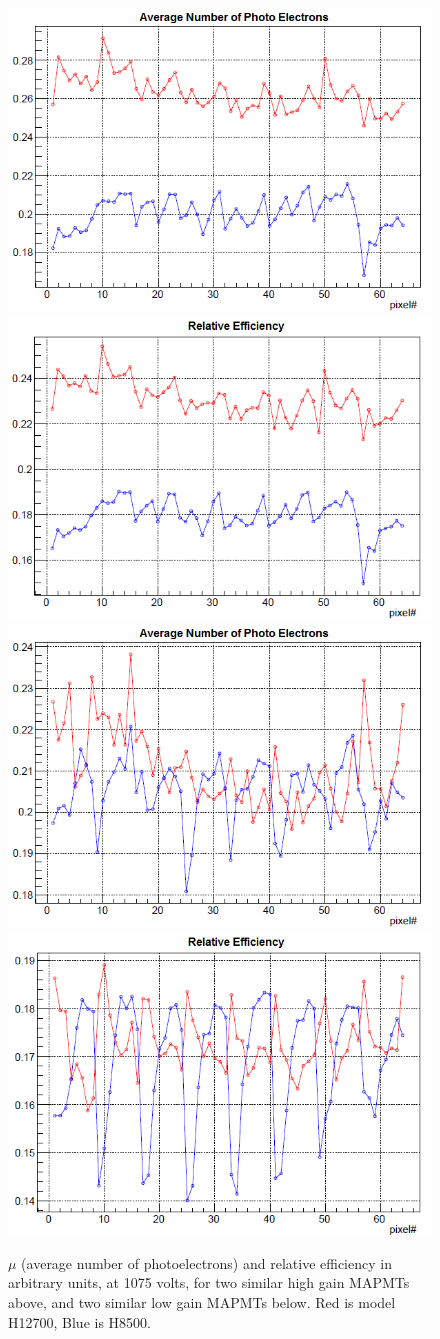 \documentclass[prc,twocolumn]{revtex4}
\begin{document}
	\begin{figure}
		\includegraphics[width=0.45\linewidth]{highmu.png} \hspace{0.1in} \includegraphics[width=0.45\linewidth]{highefficiency.png}
		\\
		\vspace{0.1in}
		\includegraphics[width=0.45\linewidth]{lowmu.png} \hspace{0.in}
		\includegraphics[width=0.45\linewidth]{lowefficiency.png}
		\caption{$\mu$ (average number of photoelectrons) and relative efficiency in arbitrary units, at 1075 volts, for two similar high gain MAPMTs above, and two similar low gain MAPMTs below. Red is model H12700, Blue is H8500.}
		\label{efficiency}
	\end{figure}
\end{document}
